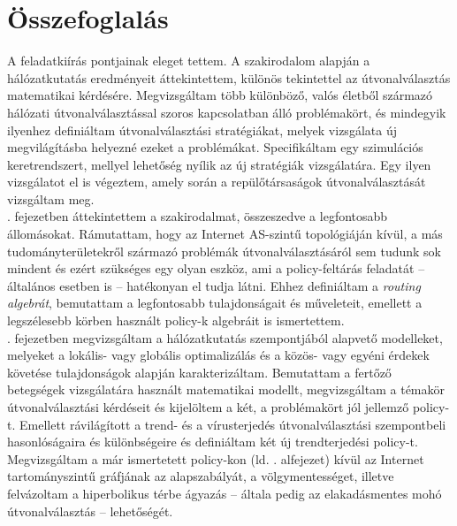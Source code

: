 \chapter{Összefoglalás}\label{summary}

A feladatkiírás pontjainak eleget tettem. A szakirodalom alapján a hálózatkutatás eredményeit áttekintettem, különös tekintettel az útvonalválasztás matematikai kérdésére. Megvizsgáltam több különböző, valós életből származó hálózati útvonalválasztással szoros kapcsolatban álló problémakört, és mindegyik ilyenhez definiáltam útvonalválasztási stratégiákat, melyek vizsgálata új megvilágításba helyezné ezeket a problémákat. Specifikáltam egy szimulációs keretrendszert, mellyel lehetőség nyílik az új stratégiák vizsgálatára. Egy ilyen vizsgálatot el is végeztem, amely során a repülőtársaságok útvonalválasztását vizsgáltam meg.\\

. fejezetben áttekintettem a szakirodalmat, összeszedve a legfontosabb állomásokat. Rámutattam, hogy az Internet AS-szintű topológiáján kívül, a más tudományterületekről származó problémák útvonalválasztásáról sem tudunk sok mindent és ezért szükséges egy olyan eszköz, ami a policy-feltárás feladatát -- általános esetben is -- hatékonyan el tudja látni. Ehhez definiáltam a \emph{routing algebrát}, bemutattam a legfontosabb tulajdonságait és műveleteit, emellett a legszélesebb körben használt policy-k algebráit is ismertettem.\\

. fejezetben megvizsgáltam a hálózatkutatás szempontjából alapvető modelleket, melyeket a lokális- vagy globális optimalizálás és a közös- vagy egyéni érdekek követése tulajdonságok alapján karakterizáltam. Bemutattam a fertőző betegségek vizsgálatára használt matematikai modellt, megvizsgáltam a témakör útvonalválasztási kérdéseit és kijelöltem a két, a problémakört jól jellemző policy-t. Emellett rávilágított a trend- és a vírusterjedés útvonalválasztási szempontbeli hasonlóságaira és különbségeire és definiáltam két új trendterjedési policy-t.\newline
Megvizsgáltam a már ismertetett policy-kon (ld. . alfejezet) kívül az Internet tartományszintű gráfjának az alapszabályát, a völgymentességet, illetve felvázoltam a hiperbolikus térbe ágyazás -- általa pedig az elakadásmentes mohó útvonalválasztás -- lehetőségét.\\


